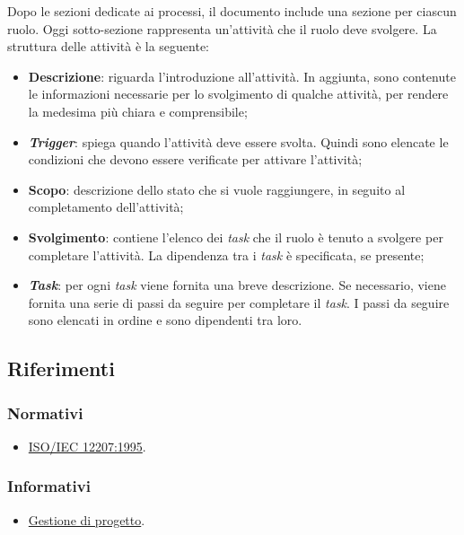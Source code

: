 Dopo le sezioni dedicate ai processi, il documento include una sezione per
ciascun ruolo. Oggi sotto-sezione rappresenta un'attività che il ruolo deve
svolgere.  La struttura delle attività è la seguente:
\begin{itemize}
	\item \textbf{Descrizione}: riguarda l'introduzione all'attività.
	      In aggiunta, sono contenute le informazioni necessarie per lo
	      svolgimento di qualche attività, per rendere la medesima più chiara e
	      comprensibile;

	\item \textbf{\textit{Trigger}}: spiega quando l'attività deve essere
	      svolta. Quindi sono elencate le condizioni che devono essere
	      verificate per attivare l'attività;

	\item \textbf{Scopo}: descrizione dello stato che si vuole raggiungere, in
	      seguito al completamento dell'attività;

	\item \textbf{Svolgimento}: contiene l'elenco dei \textit{task} che il
	      ruolo è tenuto a svolgere per completare l'attività. La dipendenza tra
	      i \textit{task} è specificata, se presente;

	\item \textbf{\textit{Task}}: per ogni \textit{task} viene fornita una
	      breve descrizione. Se necessario, viene fornita una serie di passi da
	      seguire per completare il \textit{task}. I passi da seguire sono
	      elencati in ordine e sono dipendenti tra loro.
\end{itemize}

\subsection{Riferimenti}
\subsubsection{Normativi}
\begin{itemize}
	\item \href{https://www.math.unipd.it/~tullio/IS-1/2009/Approfondimenti/ISO_12207-1995.pdf}{ISO/IEC 12207:1995}.
\end{itemize}

\subsubsection{Informativi}
\begin{itemize}
	\item \href{https://www.math.unipd.it/~tullio/IS-1/2023/Dispense/T4.pdf}{Gestione di progetto}.
\end{itemize}
